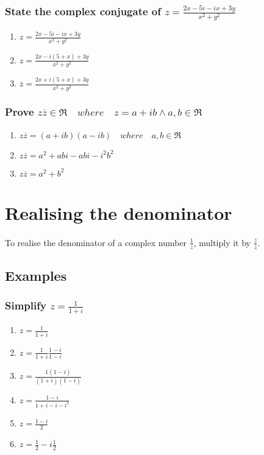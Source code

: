 \documentclass{report}
\newcommand{\conjugate}[1]{\overline{#1}}
\newcommand{\realnumbers}{\mathfrak{R}}
\newcommand{\where}{\quad where \quad}
\begin{document}
                \subsubsection{State the complex conjugate of $z=\frac{2x-5i-ix+3y}{x^2+y^2}$}
                    \begin{enumerate}
                        \item $z=\frac{2x-5i-ix+3y}{x^2+y^2}$
                        \item $z=\frac{2x-i(5+x)+3y}{x^2+y^2}$
                        \item $\conjugate{z}=\frac{2x+i(5+x)+3y}{x^2+y^2}$
                    \end{enumerate}
                \subsubsection{Prove $z\conjugate{z}\in\realnumbers \where z=a+ib\wedge a,b\in\realnumbers$}
                    \begin{enumerate}
                        \item $z\conjugate{z}=(a+ib)(a-ib) \where a,b\in\realnumbers$
                        \item $z\conjugate{z}=a^2+abi-abi-i^2b^2$
                        \item $z\conjugate{z}=a^2+b^2$
                    \end{enumerate}
        \section{Realising the denominator}
            \paragraph{}
                To realise the denominator of a complex number $\frac{1}{z}$, multiply it by $\frac{\conjugate{z}}{\conjugate{z}}$.
            \subsection{Examples}
                \subsubsection{Simplify $z=\frac{1}{1+i}$}
                    \begin{enumerate}
                        \item $z=\frac{1}{1+i}$
                        \item $z=\frac{1}{1+i}\frac{1-i}{1-i}$
                        \item $z=\frac{1(1-i)}{(1+i)(1-i)}$
                        \item $z=\frac{1-i}{1+i-i-i^2}$
                        \item $z=\frac{1-i}{2}$
                        \item $z=\frac{1}{2}-i\frac{1}{2}$
                    \end{enumerate}
\end{document}
